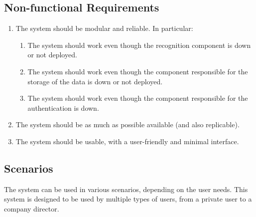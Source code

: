 \documentclass{scrartcl}
\begin{document}
    \subsection{Non-functional Requirements}\label{subsec:non-functional-requirements}
    \begin{enumerate}
        \item \label{itm:non-func-1} The system should be modular and reliable.
        In particular:
        \begin{enumerate}
            \item The system should work even though the recognition component is down or not deployed.
            \item The system should work even though the component responsible for the storage of the data is down or not deployed.
            \item The system should work even though the component responsible for the authentication is down.
        \end{enumerate}
        \item \label{itm:non-func-2} The system should be as much as possible available (and also replicable).
        \item \label{itm:non-func-3} The system should be usable, with a user-friendly and minimal interface.
    \end{enumerate}


    \subsection{Scenarios}
    The system can be used in various scenarios, depending on the user needs.
    This system is designed to be used by multiple types of users, from a private user to a company director.
\end{document}
